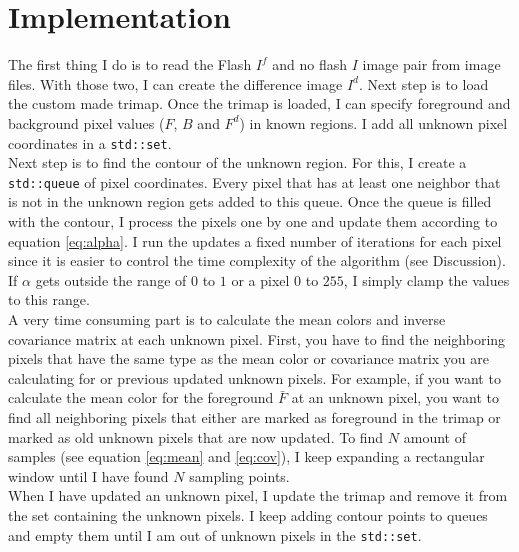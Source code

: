 \documentclass[10pt,letterpaper,twocolumn]{article}
\begin{document}
\section{Implementation}
The first thing I do is to read the Flash $I^f$ and no flash $I$ image pair from image files. With those two, I can create the difference image $I^d$. Next step is to load the custom made trimap. Once the trimap is loaded, I can specify foreground and background pixel values ($F$, $B$ and $F^d$) in known regions. I add all unknown pixel coordinates in a \texttt{std::set}.
\\
Next step is to find the contour of the unknown region. For this, I create a \texttt{std::queue} of pixel coordinates. Every pixel that has at least one neighbor that is not in the unknown region gets added to this queue. Once the queue is filled with the contour, I process the pixels one by one and update them according to equation \ref{eq:alpha}. I run the updates a fixed number of iterations for each pixel since it is easier to control the time complexity of the algorithm (see Discussion). If $\alpha$ gets outside the range of $0$ to $1$ or a pixel $0$ to $255$, I simply clamp the values to this range.
\\
A very time consuming part is to calculate the mean colors and inverse covariance matrix at each unknown pixel. First, you have to find the neighboring pixels that have the same type as the mean color or covariance matrix you are calculating for or previous updated unknown pixels. For example, if you want to calculate the mean color for the foreground $\bar{F}$ at an unknown pixel, you want to find all neighboring pixels that either are marked as foreground in the trimap or marked as old unknown pixels that are now updated. To find $N$ amount of samples (see equation \ref{eq:mean} and \ref{eq:cov}), I keep expanding a rectangular window until I have found $N$ sampling points.
\\When I have updated an unknown pixel, I update the trimap and remove it from the set containing the unknown pixels. I keep adding contour points to queues and empty them until I am out of unknown pixels in the \texttt{std::set}.
\end{document}
